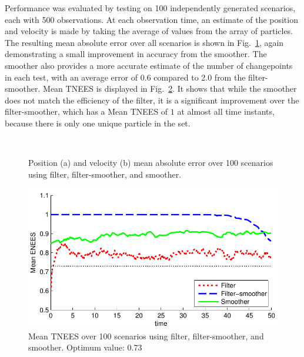 \documentclass[peerreview,11pt,draftcls,onecolumn]{IEEEtran}
\begin{document}
%
Performance was evaluated by testing on 100 independently generated scenarios, each with 500 observations. At each observation time, an estimate of the position and velocity is made by taking the average of values from the array of particles. The resulting mean absolute error over all scenarios is shown in Fig.~\ref{fig:tracking_rmse}, again demonstrating a small improvement in accuracy from the smoother. The smoother also provides a more accurate estimate of the number of changepoints in each test, with an average error of 0.6 compared to 2.0 from the filter-smoother. Mean TNEES is displayed in Fig.~\ref{fig:tracking_mtnees}. It shows that while the smoother does not match the efficiency of the filter, it is a significant improvement over the filter-smoother, which has a Mean TNEES of $1$ at almost all time instants, because there is only one unique particle in the set. %
%
\begin{figure}[!t]
\centering
{} \\
\caption{Position (a) and velocity (b) mean absolute error over 100 scenarios using filter, filter-smoother, and smoother.}
\label{fig:tracking_rmse}
\end{figure}
%
\begin{figure}[!t]
\centering
\includegraphics[width=0.45\columnwidth]{tracking_mtnees.pdf}
\caption{Mean TNEES over 100 scenarios using filter, filter-smoother, and smoother. Optimum value: 0.73}
\label{fig:tracking_mtnees}
\end{figure}
\end{document}
